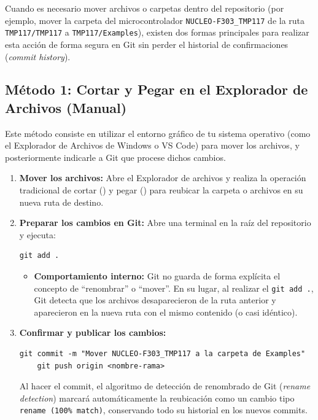 \documentclass[
10pt, %
a4paper, %
oneside, %
headinclude,footinclude, %
BCOR5mm, %
]{scrartcl}
\begin{document}
Cuando es necesario mover archivos o carpetas dentro del repositorio (por ejemplo, mover la carpeta del microcontrolador \texttt{NUCLEO-F303\_TMP117} de la ruta \texttt{TMP117/TMP117} a \texttt{TMP117/Examples}), existen dos formas principales para realizar esta acción de forma segura en Git sin perder el historial de confirmaciones (\textit{commit history}).

\subsection{Método 1: Cortar y Pegar en el Explorador de Archivos (Manual)}
Este método consiste en utilizar el entorno gráfico de tu sistema operativo (como el Explorador de Archivos de Windows o VS Code) para mover los archivos, y posteriormente indicarle a Git que procese dichos cambios.

\begin{enumerate}
	\item \textbf{Mover los archivos:} Abre el Explorador de archivos y realiza la operación tradicional de cortar () y pegar () para reubicar la carpeta o archivos en su nueva ruta de destino.
	\item \textbf{Preparar los cambios en Git:} Abre una terminal en la raíz del repositorio y ejecuta:
	\begin{lstlisting}[language=DOS]
	git add .
	\end{lstlisting}
	\begin{itemize}
		\item \textbf{Comportamiento interno:} Git no guarda de forma explícita el concepto de ``renombrar'' o ``mover''. En su lugar, al realizar el \texttt{git add .}, Git detecta que los archivos desaparecieron de la ruta anterior y aparecieron en la nueva ruta con el mismo contenido (o casi idéntico).
	\end{itemize}
	\item \textbf{Confirmar y publicar los cambios:}
	\begin{lstlisting}[language=DOS]
	git commit -m "Mover NUCLEO-F303_TMP117 a la carpeta de Examples"
	git push origin <nombre-rama>
	\end{lstlisting}
	Al hacer el commit, el algoritmo de detección de renombrado de Git (\textit{rename detection}) marcará automáticamente la reubicación como un cambio tipo \texttt{rename (100\% match)}, conservando todo su historial en los nuevos commits.
\end{enumerate}
\end{document}
